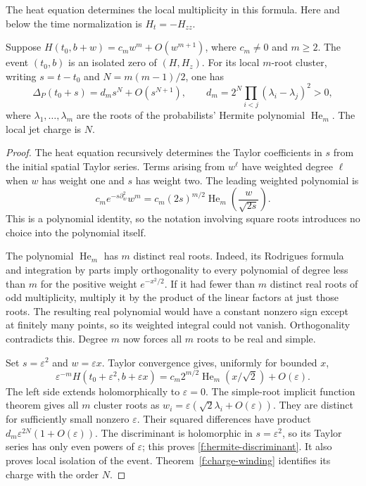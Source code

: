 The heat equation determines the local multiplicity in this formula.
Here and below the time normalization is $H_t=-H_{zz}$.

\begin{proposition}\label{f:hermite}
Suppose $H(t_0,b+w)=c_mw^m+O(w^{m+1})$, where $c_m\ne0$ and
$m\ge2$.  The event $(t_0,b)$ is an isolated zero of $(H,H_z)$.
For its local $m$-root cluster, writing $s=t-t_0$ and
$N=m(m-1)/2$, one has
\begin{equation}\label{f:hermite-discriminant}
 \Delta_P(t_0+s)=d_m s^N+O(s^{N+1}),\qquad
 d_m=2^N\prod_{i<j}(\lambda_i-\lambda_j)^2>0,
\end{equation}
where $\lambda_1,\ldots,\lambda_m$ are the roots of the probabilists'
Hermite polynomial $\operatorname{He}_m$.  The local jet charge is $N$.
\end{proposition}

\begin{proof}
The heat equation recursively determines the Taylor coefficients in
$s$ from the initial spatial Taylor series.  Terms arising from $w^\ell$
have weighted degree $\ell$ when $w$ has weight one and $s$ has weight
two.  The leading weighted polynomial is
\[
 c_m e^{-s\partial_w^2}w^m
   =c_m(2s)^{m/2}\operatorname{He}_m
                  \left(\frac{w}{\sqrt{2s}}\right).
\]
This is a polynomial identity, so the notation involving square roots
introduces no choice into the polynomial itself.

The polynomial $\operatorname{He}_m$ has $m$ distinct real roots.
Indeed, its Rodrigues formula and integration by parts imply
orthogonality to every polynomial of degree less than $m$ for the
positive weight $e^{-x^2/2}$.  If it had fewer than $m$ distinct real
roots of odd multiplicity, multiply it by the product of the linear
factors at just those roots.  The resulting real polynomial would
have a constant nonzero sign except at finitely many points, so its
weighted integral could not vanish.  Orthogonality contradicts this.
Degree $m$ now forces all $m$ roots to be real and simple.

Set $s=\varepsilon^2$ and $w=\varepsilon x$.  Taylor convergence gives,
uniformly for bounded $x$,
\[
 \varepsilon^{-m}H(t_0+\varepsilon^2,b+\varepsilon x)
 =c_m2^{m/2}\operatorname{He}_m(x/\sqrt2)+O(\varepsilon).
\]
The left side extends holomorphically to $\varepsilon=0$.
The simple-root implicit function theorem gives all $m$ cluster roots
as
$w_i=\varepsilon(\sqrt2\lambda_i+O(\varepsilon))$.
They are distinct for sufficiently small nonzero $\varepsilon$.
Their squared differences have product
$d_m\varepsilon^{2N}(1+O(\varepsilon))$.
The discriminant is holomorphic in $s=\varepsilon^2$, so its Taylor
series has only even powers of $\varepsilon$; this proves
\eqref{f:hermite-discriminant}.  It also proves local isolation of
the event.  Theorem~\ref{f:charge-winding} identifies its charge with
the order $N$.
\end{proof}

